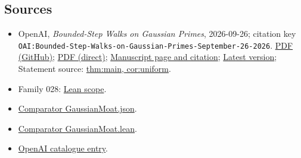 \documentclass[11pt]{article}
\begin{document}
\subsection{Sources}
\begin{itemize}
\item OpenAI, \emph{Bounded-Step Walks on Gaussian Primes}, 2026-09-26; citation key \texttt{OAI:Bounded-Step-Walks-on-Gaussian-Primes-September-26-2026}. \href{https://github.com/openai/math/blob/adc7f1241b42e322a6451854ab7e4b4c146bf78a/preprints/Bounded-Step-Walks-on-Gaussian-Primes-September-26-2026/paper.pdf}{PDF (GitHub)}; \href{https://github.com/openai/math/raw/adc7f1241b42e322a6451854ab7e4b4c146bf78a/preprints/Bounded-Step-Walks-on-Gaussian-Primes-September-26-2026/paper.pdf}{PDF (direct)}; \href{https://github.com/openai/math/blob/adc7f1241b42e322a6451854ab7e4b4c146bf78a/preprints/Bounded-Step-Walks-on-Gaussian-Primes-September-26-2026/README.md}{Manuscript page and citation}; \href{https://github.com/openai/math/blob/main/preprints/Bounded-Step-Walks-on-Gaussian-Primes-September-26-2026/paper.pdf}{Latest version}; Statement source: \href{https://github.com/openai/math/blob/adc7f1241b42e322a6451854ab7e4b4c146bf78a/preprints/Bounded-Step-Walks-on-Gaussian-Primes-September-26-2026/build/main.tex\#L63}{thm:main, cor:uniform}.
\item Family 028: \href{https://github.com/openai/math/blob/adc7f1241b42e322a6451854ab7e4b4c146bf78a/lean/docs/028.md}{Lean scope}.
\item \href{https://github.com/openai/math/blob/adc7f1241b42e322a6451854ab7e4b4c146bf78a/lean/ComparatorChallenges/GaussianMoat.json}{Comparator GaussianMoat.json}.
\item \href{https://github.com/openai/math/blob/adc7f1241b42e322a6451854ab7e4b4c146bf78a/lean/ComparatorChallenges/GaussianMoat.lean}{Comparator GaussianMoat.lean}.
\item \href{https://github.com/openai/math/blob/adc7f1241b42e322a6451854ab7e4b4c146bf78a/CONTENTS.md}{OpenAI catalogue entry}.
\end{itemize}
\end{document}
